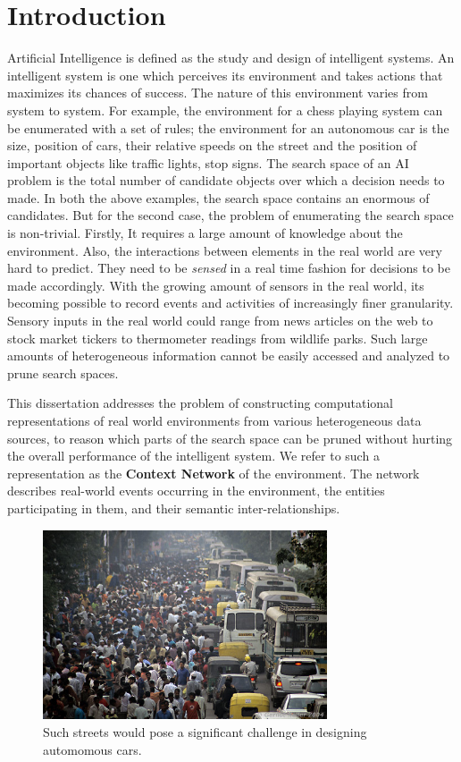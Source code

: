 \chapter{Introduction}

Artificial Intelligence is defined as the study and design of intelligent systems. An intelligent system is one which perceives its environment and takes actions that maximizes its chances of success. The nature of this environment varies from system to system. For example, the environment for a chess playing system can be enumerated with a set of rules; the environment for an autonomous car is the size, position of cars, their relative speeds on the street and the position of important objects like traffic lights, stop signs. The search space of an AI problem is the total number of candidate objects over which a decision needs to made. In both the above examples, the search space contains an enormous of candidates. But for the second case, the problem of enumerating the search space is non-trivial. Firstly, It requires a large amount of knowledge about the environment. Also, the interactions between elements in the real world are very hard to predict. They need to be \textit{sensed} in a real time fashion for decisions to be made accordingly. With the growing amount of sensors in the real world, its becoming possible to record events and activities of increasingly finer granularity. Sensory inputs in the real world could range from news articles on the web to stock market tickers to thermometer readings from wildlife parks. Such large amounts of heterogeneous information cannot be easily accessed and analyzed to prune search spaces. 

This dissertation addresses the problem of constructing computational representations of real world environments from various heterogeneous data sources, to reason which parts of the search space can be pruned without hurting the overall performance of the intelligent system. We refer to such a representation as the \textbf{Context Network} of the environment. The network describes real-world events occurring in the environment, the entities participating in them, and their semantic inter-relationships.

\begin{figure}[t]
\centering
\includegraphics[width=0.75\textwidth]{media/chapter1/india-streets.jpg}
\caption{Such streets would pose a significant challenge in designing automomous cars.}
\label{fig:india-streets}
\end{figure}


